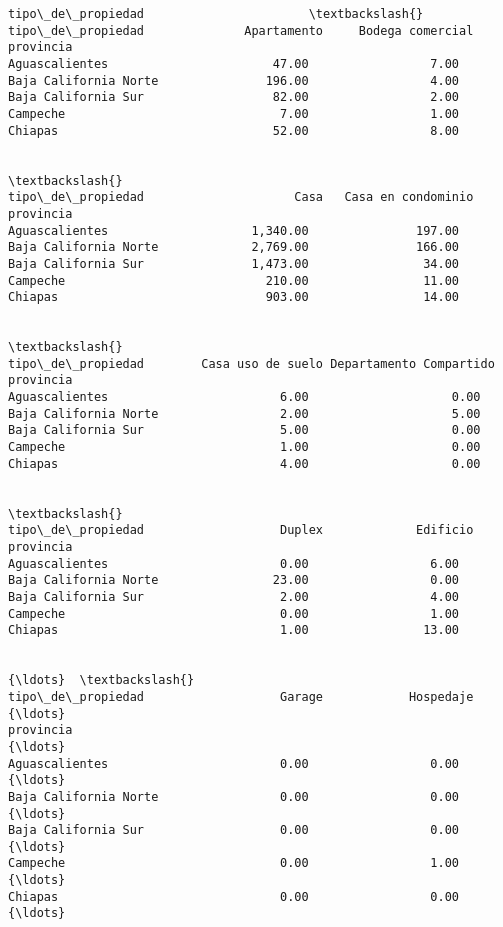 \documentclass[11pt]{article}
\newcommand{\prompt}[4]{
        \llap{{\color{#2}[#3]: #4}}\vspace{-1.25em}
    }
\begin{document}
            \begin{tcolorbox}[breakable, boxrule=.5pt, size=fbox, pad at break*=1mm, opacityfill=0]
\prompt{Out}{outcolor}{12}{\hspace{3.5pt}}
\begin{Verbatim}[commandchars=\\\{\}]
                         tipo\_de\_propiedad                       \textbackslash{}
tipo\_de\_propiedad              Apartamento     Bodega comercial
provincia
Aguascalientes                       47.00                 7.00
Baja California Norte               196.00                 4.00
Baja California Sur                  82.00                 2.00
Campeche                              7.00                 1.00
Chiapas                              52.00                 8.00

                                                                 \textbackslash{}
tipo\_de\_propiedad                     Casa   Casa en condominio
provincia
Aguascalientes                    1,340.00               197.00
Baja California Norte             2,769.00               166.00
Baja California Sur               1,473.00                34.00
Campeche                            210.00                11.00
Chiapas                             903.00                14.00

                                                                    \textbackslash{}
tipo\_de\_propiedad        Casa uso de suelo Departamento Compartido
provincia
Aguascalientes                        6.00                    0.00
Baja California Norte                 2.00                    5.00
Baja California Sur                   5.00                    0.00
Campeche                              1.00                    0.00
Chiapas                               4.00                    0.00

                                                                 \textbackslash{}
tipo\_de\_propiedad                   Duplex             Edificio
provincia
Aguascalientes                        0.00                 6.00
Baja California Norte                23.00                 0.00
Baja California Sur                   2.00                 4.00
Campeche                              0.00                 1.00
Chiapas                               1.00                13.00

                                                                 {\ldots}  \textbackslash{}
tipo\_de\_propiedad                   Garage            Hospedaje  {\ldots}
provincia                                                        {\ldots}
Aguascalientes                        0.00                 0.00  {\ldots}
Baja California Norte                 0.00                 0.00  {\ldots}
Baja California Sur                   0.00                 0.00  {\ldots}
Campeche                              0.00                 1.00  {\ldots}
Chiapas                               0.00                 0.00  {\ldots}


\end{Verbatim}
\end{tcolorbox}
\end{document}
